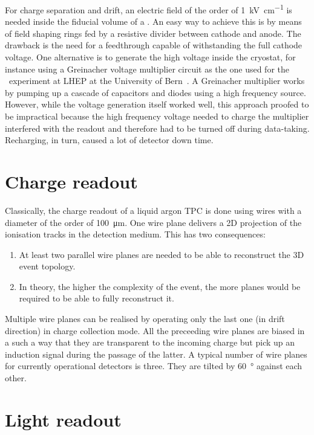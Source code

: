 For charge separation and drift, an electric field of the order of \SI{1}{\kilo\volt\per\centi\metre} is needed inside the fiducial volume of a \lartpc.
An easy way to achieve this is by means of field shaping rings fed by a resistive divider between cathode and anode.
The drawback is the need for a feedthrough capable of withstanding the full cathode voltage.
One alternative is to generate the high voltage inside the cryostat, for instance using a Greinacher voltage multiplier circuit as the one used for the \AT\ experiment at LHEP at the University of Bern~\cite{AT}.
A Greinacher multiplier works by pumping up a cascade of capacitors and diodes using a high frequency source.
However, while the voltage generation itself worked well, this approach proofed to be impractical because the high frequency voltage needed to charge the multiplier interfered with the readout and therefore had to be turned off during data-taking.
Recharging, in turn, caused a lot of detector down time.


\section{Charge readout\label{sec:lartpc_charge-ro}}

Classically, the charge readout of a liquid argon TPC is done using wires with a diameter of the order of \SI{100}{\micro\metre}.
One wire plane delivers a 2D projection of the ionisation tracks in the detection medium.
This has two consequences:
\begin{enumerate}
	\item At least two parallel wire planes are needed to be able to reconstruct the 3D event topology.
	\item In theory, the higher the complexity of the event, the more planes would be required to be able to fully reconstruct it.
\end{enumerate}
Multiple wire planes can be realised by operating only the last one (in drift direction) in charge collection mode.
All the preceeding wire planes are biased in a such a way that they are transparent to the incoming charge but pick up an induction signal during the passage of the latter.
A typical number of wire planes for currently operational detectors is three.
They are tilted by \SI{60}{\degree} against each other.


\section{Light readout\label{sec:lartpc_light-ro}}

